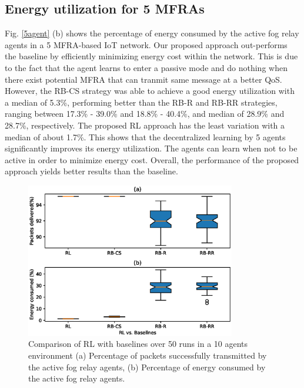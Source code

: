 \documentclass[journal]{IEEEtran}
\begin{document}
\subsection{Energy utilization for 5 MFRAs}
Fig. \ref{5agent} (b) shows the percentage of energy consumed by the active fog relay agents in a 5 MFRA-based IoT network. Our proposed approach out-performs the baseline by efficiently minimizing energy cost within the network. This is due to the fact that the agent learns to enter a passive mode and do nothing when there exist potential MFRA that can tranmit same message at a better QoS. However, the RB-CS strategy was able to achieve a good energy utilization with a median of 5.3\%, performing better than the RB-R and RB-RR strategies, ranging between 17.3\% - 39.0\% and 18.8\% - 40.4\%, and median of 28.9\% and 28.7\%, respectively. The proposed RL approach has the least variation with a median of about 1.7\%. This shows that the decentralized learning by 5 agents significantly improves its energy utilization. The agents can learn when not to be active in order to minimize energy cost. Overall, the performance of the proposed approach yields better results than the baseline.

\begin{figure}[!t]
\centering
\includegraphics[width=3.6in]{10agentbaseline.eps}
\caption{Comparison of RL with baselines over 50 runs in a 10 agents environment (a) Percentage of packets successfully transmitted by the active fog relay agents,  (b) Percentage of energy consumed by the active fog relay agents.}
\label{10agent}
\end{figure}
\end{document}
